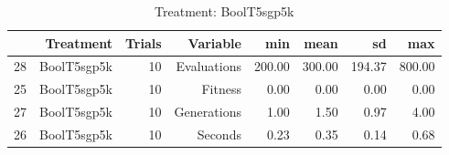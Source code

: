 \begin{table}[ht]
\centering
\begin{tabular}{rrrrrrrr}
  \hline
 & Treatment & Trials & Variable & min & mean & sd & max \\ 
  \hline
28 & BoolT5sgp5k &  10 & Evaluations & 200.00 & 300.00 & 194.37 & 800.00 \\ 
  25 & BoolT5sgp5k &  10 & Fitness & 0.00 & 0.00 & 0.00 & 0.00 \\ 
  27 & BoolT5sgp5k &  10 & Generations & 1.00 & 1.50 & 0.97 & 4.00 \\ 
  26 & BoolT5sgp5k &  10 & Seconds & 0.23 & 0.35 & 0.14 & 0.68 \\ 
   \hline
\end{tabular}
\caption{Treatment: BoolT5sgp5k} 
\end{table}
